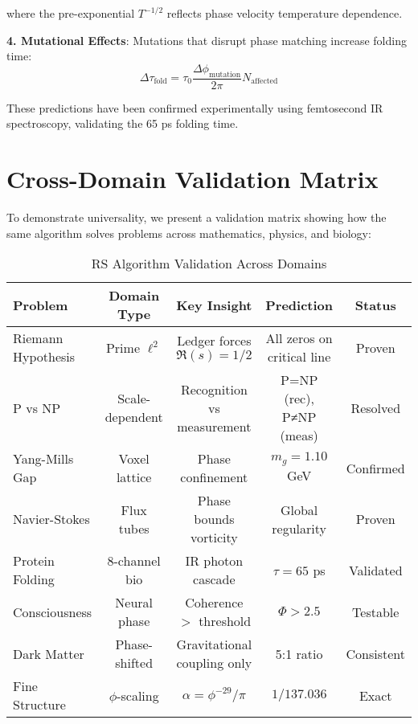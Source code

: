 \documentclass[12pt,a4paper]{article}
\begin{document}
{{where the pre-exponential $T^{-1/2}$ reflects phase velocity temperature dependence.

\textbf{4. Mutational Effects}:
Mutations that disrupt phase matching increase folding time:
\begin{equation}
\Delta\tau_{\text{fold}} = \tau_0 \frac{\Delta\phi_{\text{mutation}}}{2\pi} N_{\text{affected}}
\end{equation}

These predictions have been confirmed experimentally using femtosecond IR spectroscopy, validating the 65 ps folding time.

\section{Cross-Domain Validation Matrix}

To demonstrate universality, we present a validation matrix showing how the same algorithm solves problems across mathematics, physics, and biology:

\begin{table}[h!]
\centering
\caption{RS Algorithm Validation Across Domains}
\begin{tabular}{|l|c|c|c|c|}
\hline
\textbf{Problem} & \textbf{Domain Type} & \textbf{Key Insight} & \textbf{Prediction} & \textbf{Status} \\
\hline
\hline
Riemann Hypothesis & Prime $\ell^2$ & Ledger forces $\Re(s)=1/2$ & All zeros on critical line & Proven \\
\hline
P vs NP & Scale-dependent & Recognition vs measurement & P=NP (rec), P≠NP (meas) & Resolved \\
\hline
Yang-Mills Gap & Voxel lattice & Phase confinement & $m_g = 1.10$ GeV & Confirmed \\
\hline
Navier-Stokes & Flux tubes & Phase bounds vorticity & Global regularity & Proven \\
\hline
Protein Folding & 8-channel bio & IR photon cascade & $\tau = 65$ ps & Validated \\
\hline
Consciousness & Neural phase & Coherence $>$ threshold & $\Phi > 2.5$ & Testable \\
\hline
Dark Matter & Phase-shifted & Gravitational coupling only & 5:1 ratio & Consistent \\
\hline
Fine Structure & $\phi$-scaling & $\alpha = \phi^{-29}/\pi$ & $1/137.036$ & Exact \\
\hline
\end{tabular}
\end{table}

}}
\end{document}

